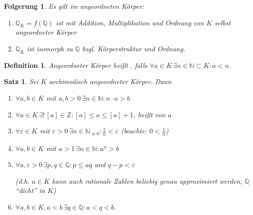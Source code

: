 \documentclass[ngerman,a4paper]{report}
\theoremstyle{break}
\newtheorem{satz}[theorem]{Satz}
\newtheorem*{definition}{Definition}
\newtheorem{conclusion}[theorem]{Folgerung}
\renewcommand{\epsilon}{\varepsilon}
\begin{document}
\begin{conclusion}
	Es gilt im angeordneten Körper:
	\begin{enumerate}[label={\arabic*)}]
		\item $\mathbb{Q}_K = f(\mathbb{Q})$ ist mit Addition, Multiplikation und Ordnung von $K$ selbst angeordneter Körper
		\item $\mathbb{Q}_K$ ist isomorph zu $\mathbb{Q}$ bzgl. Körperstruktur und Ordnung.
	\end{enumerate}
\end{conclusion}

\begin{definition}
	Angeordneter Körper heißt , falls $\forall a\in K\,\exists n\in\mathbb{N}\subset K: a < n$.
\end{definition}
\begin{satz}
	Sei $K$ archimedisch angeordneter Körper. Dann\begin{enumerate}[label={\arabic*)}]
		\item $\forall a,b\in K$ mit $a,b>0\,\exists n\in\mathbb{N}: n\cdot a > b$
		\item $\forall a\in K\,\exists!\,[a]\in\mathbb{Z}: [a]\le a \le [a] +1$,  heißt  von $a$
		\item $\forall \epsilon \in K$ mit $\epsilon > 0\,\exists n\in\mathbb{N}_{\neq 0}: \frac{1}{n}< \epsilon$ (beachte: $0 < \frac{1}{n}$)
		\item $\forall a,b\in K$ mit $a>1\,\exists n\in\mathbb{N}: a^n > b$
		\item $\forall a,\epsilon > 0\,\exists p,q\in\mathbb{Q}: p \le a  q$ und $q - p < \epsilon$
		
		(d.h. $a\in K$ kann auch rationale Zahlen beliebig genau approximiert werden, $\mathbb{Q}$ "`dicht"' in $K$)
		\item $\forall a,b\in K, a < b\,\exists q\in\mathbb{Q}:a < q < b$.
	\end{enumerate}
\end{satz}
\end{document}
